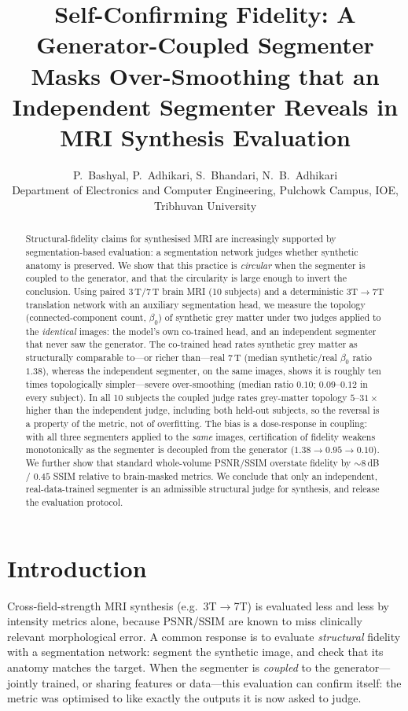 \documentclass[11pt,a4paper]{article}
\title{\bfseries Self-Confirming Fidelity: A Generator-Coupled Segmenter Masks
Over-Smoothing that an Independent Segmenter Reveals in MRI Synthesis Evaluation}
\author{P.\ Bashyal, P.\ Adhikari, S.\ Bhandari, N.\ B.\ Adhikari\\
\small Department of Electronics and Computer Engineering, Pulchowk Campus, IOE, Tribhuvan University}
\date{}
\begin{document}
\maketitle

\begin{abstract}
\noindent Structural-fidelity claims for synthesised MRI are increasingly supported by
segmentation-based evaluation: a segmentation network judges whether synthetic anatomy is
preserved. We show that this practice is \emph{circular} when the segmenter is coupled to the
generator, and that the circularity is large enough to invert the conclusion. Using paired
3\,T/7\,T brain MRI (10 subjects) and a deterministic 3T$\rightarrow$7T translation network with an
auxiliary segmentation head, we measure the topology (connected-component count, $\beta_0$) of
synthetic grey matter under two judges applied to the \emph{identical} images: the model's own
co-trained head, and an independent segmenter that never saw the generator. The co-trained head
rates synthetic grey matter as structurally comparable to---or richer than---real 7\,T (median
synthetic/real $\beta_0$ ratio $1.38$), whereas the independent segmenter, on the same images,
shows it is roughly ten times topologically simpler---severe over-smoothing (median ratio $0.10$;
$0.09$--$0.12$ in every subject). In all 10 subjects the coupled judge rates grey-matter topology
$5$--$31\times$ higher than the independent judge, including both held-out subjects, so the reversal
is a property of the metric, not of overfitting. The bias is a dose-response in coupling: with all
three segmenters applied to the \emph{same} images, certification of fidelity weakens monotonically
as the segmenter is decoupled from the generator ($1.38 \rightarrow 0.95 \rightarrow 0.10$). We further show that standard
whole-volume PSNR/SSIM overstate fidelity by ${\sim}8$\,dB / $0.45$ SSIM relative to brain-masked
metrics. We conclude that only an independent, real-data-trained segmenter is an admissible
structural judge for synthesis, and release the evaluation protocol.
\end{abstract}

\section{Introduction}
Cross-field-strength MRI synthesis (e.g.\ 3T$\rightarrow$7T) is evaluated less and less by
intensity metrics alone, because PSNR/SSIM are known to miss clinically relevant morphological
error. A common response is to evaluate \emph{structural} fidelity with a segmentation network:
segment the synthetic image, and check that its anatomy matches the target. When the segmenter is
\emph{coupled} to the generator---jointly trained, or sharing features or data---this evaluation
can confirm itself: the metric was optimised to like exactly the outputs it is now asked to judge.
\end{document}
